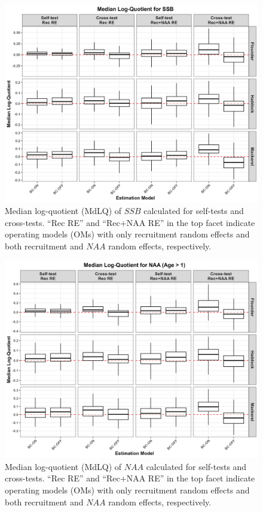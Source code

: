 \documentclass[
  12pt,
]{article}
\begin{document}
\begin{figure}[H]
    \centering
    \includegraphics[width=\textwidth]{Revised_Figures&Tables/MdLQ_SSB.PNG}
    \caption{Median log-quotient (MdLQ) of $SSB$ calculated for self-tests and cross-tests. ``Rec RE'' and ``Rec+NAA RE'' in the top facet indicate operating models (OMs) with only recruitment random effects and both recruitment and $NAA$ random effects, respectively.}
    \label{fig:supp_SSB_MdLQ}
\end{figure}

\begin{figure}[H]
    \centering
    \includegraphics[width=\textwidth]{Revised_Figures&Tables/MdLQ_NAA.PNG}
    \caption{Median log-quotient (MdLQ) of $NAA$ calculated for self-tests and cross-tests. ``Rec RE'' and ``Rec+NAA RE'' in the top facet indicate operating models (OMs) with only recruitment random effects and both recruitment and $NAA$ random effects, respectively.}
    \label{fig:supp_NAA_MdLQ}
\end{figure}
\end{document}
